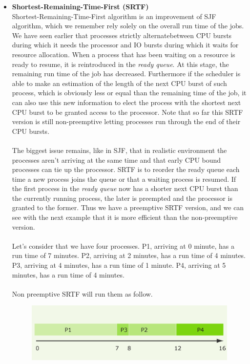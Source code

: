 \documentclass[11pt,a4paper]{scrreprt}
\begin{document}
\begin{itemize}
\item \textbf{Shortest-Remaining-Time-First (SRTF)} \\
Shortest-Remaining-Time-First algorithm is an improvement of SJF algorithm, which we remember rely solely on the overall run time of the jobs. We have seen earlier that processes strictly alternatebetween CPU bursts during which it needs the processor and IO bursts during which it waits for resource allocation. When a process that has been waiting on a resource is ready to resume, it is reintroduced in the \textit{ready queue}. At this stage, the remaining run time of the job has decreased. Furthermore if the scheduler is able to make an estimation of the length of the next CPU burst of such process, which is obviously less or equal than the remaining time of the job, it can also use this new information to elect the process with the shortest next CPU burst to be granted access to the processor. Note that so far this SRTF version is still non-preemptive letting processes run through the end of their CPU bursts. \\\\
The biggest issue remains, like in SJF, that in realistic environment the processes aren’t arriving at the same time and that early CPU bound processes can tie up the processor. SRTF is to reorder the ready queue each time a new process joins the queue or that a waiting process is resumed. If the first process in the \textit{ready queue} now has a shorter next CPU burst than the currently running process, the later is preempted and the processor is granted to the former. Thus we have a preemptive SRTF version, and we can see with the next example that it is more efficient than the non-preemptive version. \\\\
Let's consider that we have four processes. P1, arriving at 0 minute, has a run time of 7 minutes. P2, arriving at 2 minutes, has a run time of 4 minutes. P3, arriving at 4 minutes, has a run time of 1 minute. P4, arriving at 5 minutes, has a run time of 4 minutes. \\\\
Non preemptive SRTF will run them as follow.
\begin{figure}[!ht]
\centering
\includegraphics[width=0.65\linewidth]{img/Fig10a.png}

\end{figure}
\end{itemize}
\end{document}
